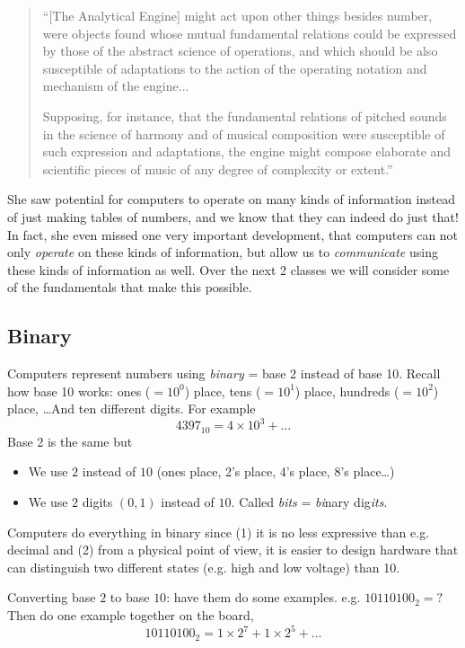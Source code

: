 \documentclass{article}
\begin{document}
\begin{quote}
``[The Analytical Engine] might act upon other things besides number,
were objects found whose mutual fundamental relations could be
expressed by those of the abstract science of operations, and which
should be also susceptible of adaptations to the action of the
operating notation and mechanism of the engine...

Supposing, for instance, that the fundamental relations of pitched
sounds in the science of harmony and of musical composition were
susceptible of such expression and adaptations, the engine might
compose elaborate and scientific pieces of music of any degree of
complexity or extent.''
\end{quote}

She saw potential for computers to operate on many kinds of
information instead of just making tables of numbers, and we know that
they can indeed do just that!  In fact, she even missed one very
important development, that computers can not only \emph{operate} on
these kinds of information, but allow us to \emph{communicate} using
these kinds of information as well.  Over the next 2 classes we will
consider some of the fundamentals that make this possible.

\subsection*{Binary}

Computers represent numbers using \emph{binary} = base 2 instead of
base 10.  Recall how base 10 works: ones ($=10^0$) place, tens
($=10^1$) place, hundreds ($=10^2$) place, \dots  And ten different
digits.  For example \[ 4397_{10} = 4 \times 10^3 + \dots \] Base 2 is
the same but
\begin{itemize}
\item We use $2$ instead of $10$ (ones place, 2's place, 4's place,
  8's place\dots)
\item We use $2$ digits $(0,1)$ instead of $10$.  Called \emph{bits} =
  \emph{bi}nary dig\emph{its}.
\end{itemize}
Computers do everything in binary since (1) it is no less expressive
than e.g. decimal and (2) from a physical point of view, it is easier
to design hardware that can distinguish two different states
(e.g. high and low voltage) than 10.

Converting base $2$ to base $10$: have them do some
examples. e.g. $10110100_2 = ?$  Then do one example together on the
board, \[ 10110100_2 = 1 \times 2^7 + 1 \times 2^5 + \dots \]
\end{document}
